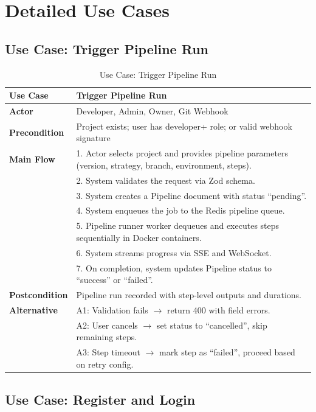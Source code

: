 \documentclass[12pt,a4paper,twoside]{report}
\begin{document}
\section{Detailed Use Cases}

\subsection{Use Case: Trigger Pipeline Run}

\begin{table}[H]
\centering
\caption{Use Case: Trigger Pipeline Run}
\begin{tabularx}{\textwidth}{l|X}
\toprule
\textbf{Use Case} & Trigger Pipeline Run \\
\midrule
\textbf{Actor} & Developer, Admin, Owner, Git Webhook \\
\textbf{Precondition} & Project exists; user has developer+ role; or valid webhook signature \\
\textbf{Main Flow} & 1. Actor selects project and provides pipeline parameters (version, strategy, branch, environment, steps). \\
& 2. System validates the request via Zod schema. \\
& 3. System creates a Pipeline document with status ``pending''. \\
& 4. System enqueues the job to the Redis pipeline queue. \\
& 5. Pipeline runner worker dequeues and executes steps sequentially in Docker containers. \\
& 6. System streams progress via SSE and WebSocket. \\
& 7. On completion, system updates Pipeline status to ``success'' or ``failed''. \\
\textbf{Postcondition} & Pipeline run recorded with step-level outputs and durations. \\
\textbf{Alternative} & A1: Validation fails $\rightarrow$ return 400 with field errors. \\
& A2: User cancels $\rightarrow$ set status to ``cancelled'', skip remaining steps. \\
& A3: Step timeout $\rightarrow$ mark step as ``failed'', proceed based on retry config. \\
\bottomrule
\end{tabularx}
\end{table}

\subsection{Use Case: Register and Login}
\end{document}
